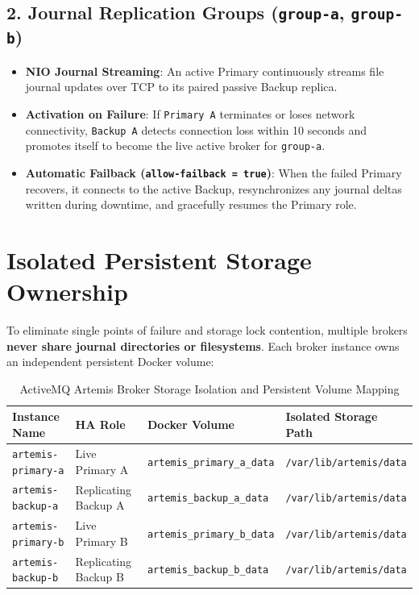 \subsection{2. Journal Replication Groups (\texttt{group-a}, \texttt{group-b})}
\begin{itemize}
    \item \textbf{NIO Journal Streaming}: An active Primary continuously streams file journal updates over TCP to its paired passive Backup replica.
    \item \textbf{Activation on Failure}: If \texttt{Primary A} terminates or loses network connectivity, \texttt{Backup A} detects connection loss within 10 seconds and promotes itself to become the live active broker for \texttt{group-a}.
    \item \textbf{Automatic Failback (\texttt{allow-failback = true})}: When the failed Primary recovers, it connects to the active Backup, resynchronizes any journal deltas written during downtime, and gracefully resumes the Primary role.
\end{itemize}

\section{Isolated Persistent Storage Ownership}

To eliminate single points of failure and storage lock contention, multiple brokers \textbf{never share journal directories or filesystems}. Each broker instance owns an independent persistent Docker volume:

\begin{table}[htbp]
\centering
\small
\begin{tabularx}{\textwidth}{l l p{4.0cm} X}
\toprule
\textbf{Instance Name} & \textbf{HA Role} & \textbf{Docker Volume} & \textbf{Isolated Storage Path} \\
\midrule
\texttt{artemis-primary-a} & Live Primary A & \texttt{artemis\_primary\_a\_data} & \texttt{/var/lib/artemis/data} \\
\texttt{artemis-backup-a} & Replicating Backup A & \texttt{artemis\_backup\_a\_data} & \texttt{/var/lib/artemis/data} \\
\texttt{artemis-primary-b} & Live Primary B & \texttt{artemis\_primary\_b\_data} & \texttt{/var/lib/artemis/data} \\
\texttt{artemis-backup-b} & Replicating Backup B & \texttt{artemis\_backup\_b\_data} & \texttt{/var/lib/artemis/data} \\
\bottomrule
\end{tabularx}
\caption{ActiveMQ Artemis Broker Storage Isolation and Persistent Volume Mapping}
\label{tab:storage_isolation}
\end{table}

